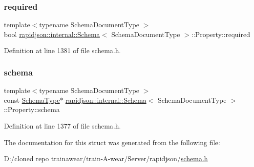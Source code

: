\subsubsection{\texorpdfstring{required}{required}}
{\footnotesize\ttfamily template$<$typename Schema\+Document\+Type $>$ \\
bool \mbox{\hyperlink{classrapidjson_1_1internal_1_1_schema}{rapidjson\+::internal\+::\+Schema}}$<$ Schema\+Document\+Type $>$\+::Property\+::required}



Definition at line 1381 of file schema.\+h.

\mbox{\label{structrapidjson_1_1internal_1_1_schema_1_1_property_a345dd1d9c4152bf936c4261627c04a44}} 
\subsubsection{\texorpdfstring{schema}{schema}}
{\footnotesize\ttfamily template$<$typename Schema\+Document\+Type $>$ \\
const \mbox{\hyperlink{classrapidjson_1_1internal_1_1_schema_a62e03be17971648a9d614244ffcb0f10}{Schema\+Type}}$\ast$ \mbox{\hyperlink{classrapidjson_1_1internal_1_1_schema}{rapidjson\+::internal\+::\+Schema}}$<$ Schema\+Document\+Type $>$\+::Property\+::schema}



Definition at line 1377 of file schema.\+h.



The documentation for this struct was generated from the following file\+:\begin{DoxyCompactItemize}
\item 
D\+:/cloned repo trainawear/train-\/\+A-\/wear/\+Server/rapidjson/\mbox{\hyperlink{schema_8h}{schema.\+h}}\end{DoxyCompactItemize}
